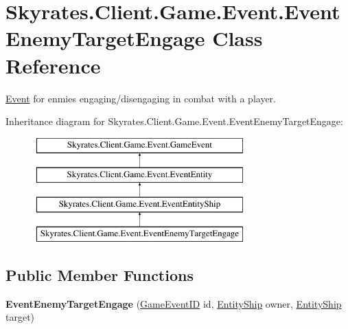 \hypertarget{class_skyrates_1_1_client_1_1_game_1_1_event_1_1_event_enemy_target_engage}{\section{Skyrates.\-Client.\-Game.\-Event.\-Event\-Enemy\-Target\-Engage Class Reference}
\label{class_skyrates_1_1_client_1_1_game_1_1_event_1_1_event_enemy_target_engage}
}


\hyperlink{namespace_skyrates_1_1_client_1_1_game_1_1_event}{Event} for enmies engaging/disengaging in combat with a player.  


Inheritance diagram for Skyrates.\-Client.\-Game.\-Event.\-Event\-Enemy\-Target\-Engage\-:\begin{figure}[H]
\begin{center}
\leavevmode
\includegraphics[height=4.000000cm]{class_skyrates_1_1_client_1_1_game_1_1_event_1_1_event_enemy_target_engage}
\end{center}
\end{figure}
\subsection*{Public Member Functions}
\begin{DoxyCompactItemize}
\item 
\hypertarget{class_skyrates_1_1_client_1_1_game_1_1_event_1_1_event_enemy_target_engage_a0dda4e7bbea880d425a72a855a95f3e1}{{\bfseries Event\-Enemy\-Target\-Engage} (\hyperlink{namespace_skyrates_1_1_client_1_1_game_1_1_event_a3a7e5dc62ad299d5e53abb4a3e5d5088}{Game\-Event\-I\-D} id, \hyperlink{class_skyrates_1_1_client_1_1_entity_1_1_entity_ship}{Entity\-Ship} owner, \hyperlink{class_skyrates_1_1_client_1_1_entity_1_1_entity_ship}{Entity\-Ship} target)}\label{class_skyrates_1_1_client_1_1_game_1_1_event_1_1_event_enemy_target_engage_a0dda4e7bbea880d425a72a855a95f3e1}

\end{DoxyCompactItemize}

